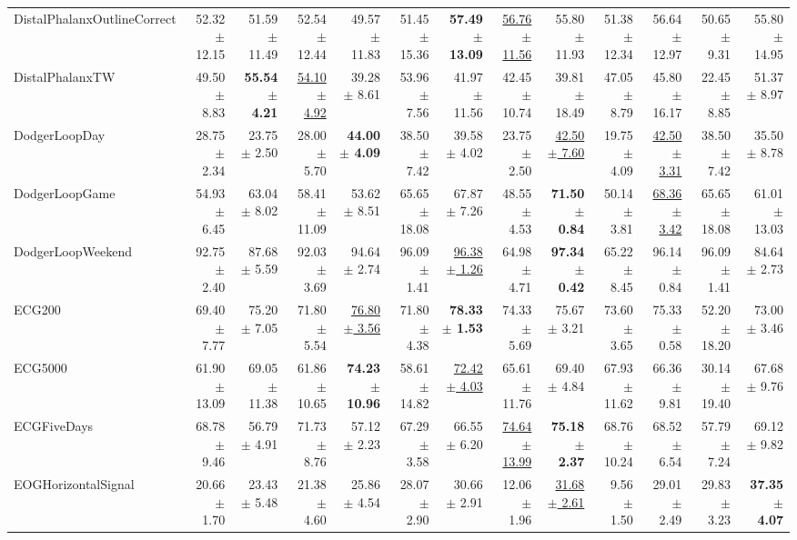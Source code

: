 \begin{landscape}
\begin{longtable}{lrrrrrrrrrrrr}
DistalPhalanxOutlineCorrect & 52.32 $\pm$ 12.15 & 51.59 $\pm$ 11.49 & 52.54 $\pm$ 12.44 & 49.57 $\pm$ 11.83 & 51.45 $\pm$ 15.36 & \textbf{57.49 $\pm$ 13.09} & \underline{56.76 $\pm$ 11.56} & 55.80 $\pm$ 11.93 & 51.38 $\pm$ 12.34 & 56.64 $\pm$ 12.97 & 50.65 $\pm$ 9.31 & 55.80 $\pm$ 14.95 \\
DistalPhalanxTW & 49.50 $\pm$ 8.83 & \textbf{55.54 $\pm$ 4.21} & \underline{54.10 $\pm$ 4.92} & 39.28 $\pm$ 8.61 & 53.96 $\pm$ 7.56 & 41.97 $\pm$ 11.56 & 42.45 $\pm$ 10.74 & 39.81 $\pm$ 18.49 & 47.05 $\pm$ 8.79 & 45.80 $\pm$ 16.17 & 22.45 $\pm$ 8.85 & 51.37 $\pm$ 8.97 \\
DodgerLoopDay & 28.75 $\pm$ 2.34 & 23.75 $\pm$ 2.50 & 28.00 $\pm$ 5.70 & \textbf{44.00 $\pm$ 4.09} & 38.50 $\pm$ 7.42 & 39.58 $\pm$ 4.02 & 23.75 $\pm$ 2.50 & \underline{42.50 $\pm$ 7.60} & 19.75 $\pm$ 4.09 & \underline{42.50 $\pm$ 3.31} & 38.50 $\pm$ 7.42 & 35.50 $\pm$ 8.78 \\
DodgerLoopGame & 54.93 $\pm$ 6.45 & 63.04 $\pm$ 8.02 & 58.41 $\pm$ 11.09 & 53.62 $\pm$ 8.51 & 65.65 $\pm$ 18.08 & 67.87 $\pm$ 7.26 & 48.55 $\pm$ 4.53 & \textbf{71.50 $\pm$ 0.84} & 50.14 $\pm$ 3.81 & \underline{68.36 $\pm$ 3.42} & 65.65 $\pm$ 18.08 & 61.01 $\pm$ 13.03 \\
DodgerLoopWeekend & 92.75 $\pm$ 2.40 & 87.68 $\pm$ 5.59 & 92.03 $\pm$ 3.69 & 94.64 $\pm$ 2.74 & 96.09 $\pm$ 1.41 & \underline{96.38 $\pm$ 1.26} & 64.98 $\pm$ 4.71 & \textbf{97.34 $\pm$ 0.42} & 65.22 $\pm$ 8.45 & 96.14 $\pm$ 0.84 & 96.09 $\pm$ 1.41 & 84.64 $\pm$ 2.73 \\
ECG200 & 69.40 $\pm$ 7.77 & 75.20 $\pm$ 7.05 & 71.80 $\pm$ 5.54 & \underline{76.80 $\pm$ 3.56} & 71.80 $\pm$ 4.38 & \textbf{78.33 $\pm$ 1.53} & 74.33 $\pm$ 5.69 & 75.67 $\pm$ 3.21 & 73.60 $\pm$ 3.65 & 75.33 $\pm$ 0.58 & 52.20 $\pm$ 18.20 & 73.00 $\pm$ 3.46 \\
ECG5000 & 61.90 $\pm$ 13.09 & 69.05 $\pm$ 11.38 & 61.86 $\pm$ 10.65 & \textbf{74.23 $\pm$ 10.96} & 58.61 $\pm$ 14.82 & \underline{72.42 $\pm$ 4.03} & 65.61 $\pm$ 11.76 & 69.40 $\pm$ 4.84 & 67.93 $\pm$ 11.62 & 66.36 $\pm$ 9.81 & 30.14 $\pm$ 19.40 & 67.68 $\pm$ 9.76 \\
ECGFiveDays & 68.78 $\pm$ 9.46 & 56.79 $\pm$ 4.91 & 71.73 $\pm$ 8.76 & 57.12 $\pm$ 2.23 & 67.29 $\pm$ 3.58 & 66.55 $\pm$ 6.20 & \underline{74.64 $\pm$ 13.99} & \textbf{75.18 $\pm$ 2.37} & 68.76 $\pm$ 10.24 & 68.52 $\pm$ 6.54 & 57.79 $\pm$ 7.24 & 69.12 $\pm$ 9.82 \\
EOGHorizontalSignal & 20.66 $\pm$ 1.70 & 23.43 $\pm$ 5.48 & 21.38 $\pm$ 4.60 & 25.86 $\pm$ 4.54 & 28.07 $\pm$ 2.90 & 30.66 $\pm$ 2.91 & 12.06 $\pm$ 1.96 & \underline{31.68 $\pm$ 2.61} & 9.56 $\pm$ 1.50 & 29.01 $\pm$ 2.49 & 29.83 $\pm$ 3.23 & \textbf{37.35 $\pm$ 4.07} \\

\end{longtable}
\end{landscape}
